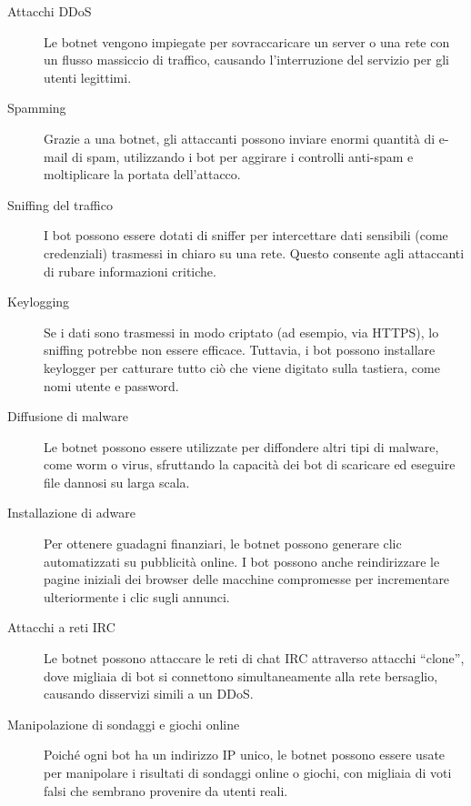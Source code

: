 \begin{description}
    \item[Attacchi DDoS] Le botnet vengono impiegate per sovraccaricare un server o una rete con un flusso massiccio di traffico, causando l'interruzione del servizio per gli utenti legittimi.
    
    \item[Spamming] Grazie a una botnet, gli attaccanti possono inviare enormi quantità di e-mail di spam, utilizzando i bot per aggirare i controlli anti-spam e moltiplicare la portata dell'attacco.
    
    \item[Sniffing del traffico] I bot possono essere dotati di sniffer per intercettare dati sensibili (come credenziali) trasmessi in chiaro su una rete. Questo consente agli attaccanti di rubare informazioni critiche.
    
    \item[Keylogging] Se i dati sono trasmessi in modo criptato (ad esempio, via HTTPS), lo sniffing potrebbe non essere efficace. Tuttavia, i bot possono installare keylogger per catturare tutto ciò che viene digitato sulla tastiera, come nomi utente e password.
    
    \item[Diffusione di malware] Le botnet possono essere utilizzate per diffondere altri tipi di malware, come worm o virus, sfruttando la capacità dei bot di scaricare ed eseguire file dannosi su larga scala.
    
    \item[Installazione di adware] Per ottenere guadagni finanziari, le botnet possono generare clic automatizzati su pubblicità online. I bot possono anche reindirizzare le pagine iniziali dei browser delle macchine compromesse per incrementare ulteriormente i clic sugli annunci.
    
    \item[Attacchi a reti IRC] Le botnet possono attaccare le reti di chat IRC attraverso attacchi ``clone'', dove migliaia di bot si connettono simultaneamente alla rete bersaglio, causando disservizi simili a un DDoS.
    
    \item[Manipolazione di sondaggi e giochi online] Poiché ogni bot ha un indirizzo IP unico, le botnet possono essere usate per manipolare i risultati di sondaggi online o giochi, con migliaia di voti falsi che sembrano provenire da utenti reali.
\end{description}

